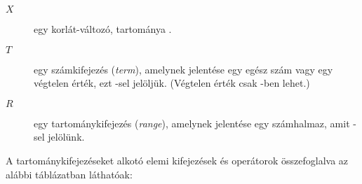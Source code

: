 \begin{description}
\item[$X$] egy korlát-változó, tartománya . \vspace*{-1ex}
\item[$T$] egy számkifejezés ({\em term}), amelynek jelentése 
egy egész szám vagy egy végtelen érték, ezt -sel jelöljük. 
(Végtelen érték csak -ben lehet.) \vspace*{-1ex}
\item[$R$] egy tartománykifejezés ({\em range}), amelynek jelentése
egy számhalmaz, amit -sel jelölünk.
\end{description}

A tartománykifejezéseket alkotó elemi kifejezések és operátorok összefoglalva az
alábbi táblázatban láthatóak:

